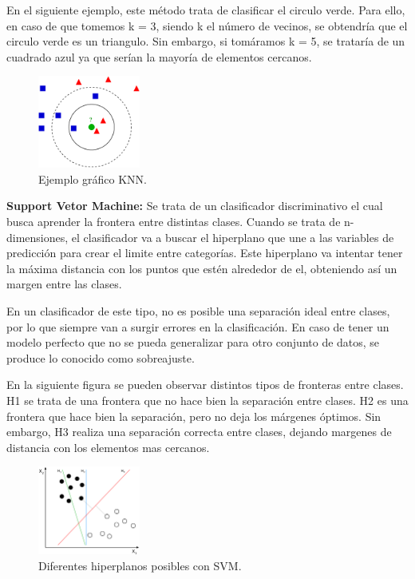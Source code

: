 En el siguiente ejemplo, este método trata de clasificar el circulo verde. Para ello, en caso de que tomemos k = 3, siendo k el número de vecinos, se obtendría que el circulo verde es un triangulo. Sin embargo, si tomáramos k = 5, se trataría de un cuadrado azul ya que serían la mayoría de elementos cercanos.

\begin{figure}[ht]
	\centering
		\includegraphics[width=0.3\textwidth]{imgs/knn.png}
		\caption{Ejemplo gráfico KNN.}
	\label{fig:Ejemplo gráfico KNN}
\end{figure}


\textbf{Support Vetor Machine:} Se trata de un clasificador discriminativo el cual busca aprender la frontera entre distintas clases. Cuando se trata de n-dimensiones, el clasificador va a buscar el hiperplano que une a las variables de predicción para crear el limite entre categorías. Este hiperplano va intentar tener la máxima distancia con los puntos que estén alrededor de el, obteniendo así un margen entre las clases. 

En un clasificador de este tipo, no es posible una separación ideal entre clases, por lo que siempre van a surgir errores en la clasificación. En caso de tener un modelo perfecto que no se pueda generalizar para otro conjunto de datos, se produce lo conocido como sobreajuste. 

En la siguiente figura se pueden observar distintos tipos de fronteras entre clases. H1 se trata de una frontera que no hace bien la separación entre clases. H2 es una frontera que hace bien la separación, pero no deja los márgenes óptimos. Sin embargo, H3 realiza una separación correcta entre clases, dejando margenes de distancia con los elementos mas cercanos.

\begin{figure}[ht]
	\centering
		\includegraphics[width=0.3\textwidth]{imgs/SVM.png}
		\caption{Diferentes hiperplanos posibles con SVM.}
	\label{fig:hiperplanos posibles con SVM}
\end{figure}



